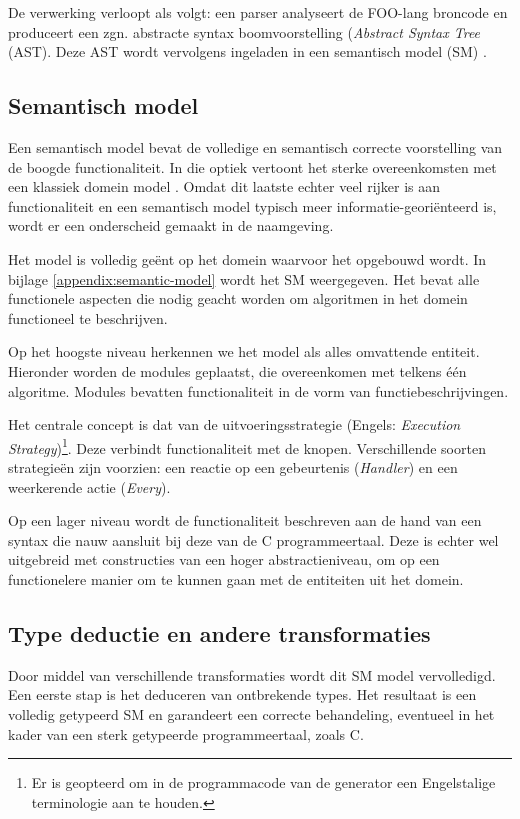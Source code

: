 De verwerking verloopt als volgt: een parser analyseert de FOO-lang broncode en
produceert een zgn. abstracte syntax boomvoorstelling (\emph{Abstract
Syntax Tree} (AST). Deze AST wordt vervolgens ingeladen in een semantisch model
(SM) \citep{fowler2010domain}.

\subsection{Semantisch model}
\label{subsection:arch-semantic-model}

Een semantisch model bevat de volledige en semantisch correcte voorstelling van
de boogde functionaliteit. In die optiek vertoont het sterke overeenkomsten met
een klassiek domein model \citep{fowler2010domain}. Omdat dit laatste echter
veel rijker is aan functionaliteit en een semantisch model typisch meer
informatie-geori\"enteerd is, wordt er een onderscheid gemaakt in de naamgeving.

Het model is volledig ge\"ent op het domein waarvoor het opgebouwd wordt. In
bijlage \ref{appendix:semantic-model} wordt het SM weergegeven. Het bevat alle
functionele aspecten die nodig geacht worden om algoritmen in het domein
functioneel te beschrijven.

Op het hoogste niveau herkennen we het model als alles omvattende entiteit.
Hieronder worden de modules geplaatst, die overeenkomen met telkens \'e\'en
algoritme. Modules bevatten functionaliteit in de vorm van
functiebeschrijvingen.

Het centrale concept is dat van de uitvoeringsstrategie (Engels:
\emph{Execution Strategy})\footnote{Er is geopteerd om in de programmacode van
de generator een Engelstalige terminologie aan te houden.}. Deze verbindt
functionaliteit met de knopen. Verschillende soorten strategie\"en zijn
voorzien: een reactie op een gebeurtenis (\emph{Handler}) en een weerkerende
actie (\emph{Every}).

Op een lager niveau wordt de functionaliteit beschreven aan de hand van een
syntax die nauw aansluit bij deze van de C programmeertaal. Deze is echter wel
uitgebreid met constructies van een hoger abstractieniveau, om op een
functionelere manier om te kunnen gaan met de entiteiten uit het domein.

\subsection{Type deductie en andere transformaties}

Door middel van verschillende transformaties wordt dit SM model vervolledigd.
Een eerste stap is het deduceren van ontbrekende types. Het resultaat is een
volledig getypeerd SM en garandeert een correcte behandeling, eventueel in het
kader van een sterk getypeerde programmeertaal, zoals C.

